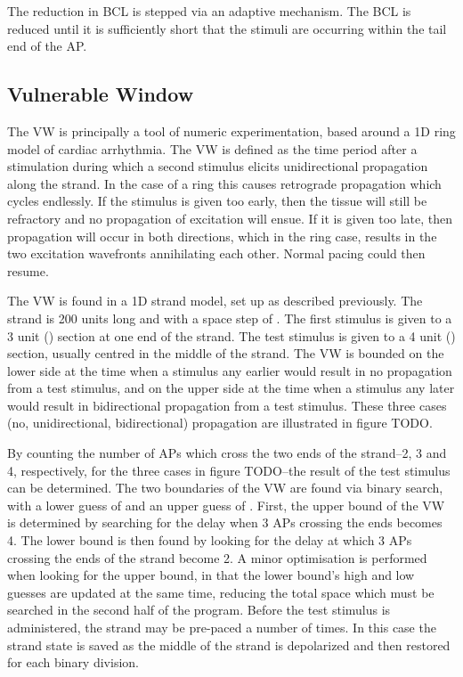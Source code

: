 The reduction in BCL is stepped via an adaptive mechanism.  The BCL is reduced
until it is sufficiently short that the stimuli are occurring within the tail end
of the AP.

\subsection{Vulnerable Window}

The VW is principally a tool of numeric experimentation, based around a 1D ring
model of cardiac arrhythmia.  The VW is defined as the time period after a
stimulation during which a second stimulus elicits unidirectional propagation
along the strand.  In the case of a ring this causes retrograde propagation
which cycles endlessly.  If the stimulus is given too early, then the tissue
will still be refractory and no propagation of excitation will ensue.  If it is
given too late, then propagation will occur in both directions, which in the
ring case, results in the two excitation wavefronts annihilating each other.
Normal pacing could then resume.

The VW is found in a 1D strand model, set up as described previously.  The
strand is 200 units long and with a space step of .  The first stimulus is
given to a 3 unit () section at one end of the strand.  The test stimulus
is given to a 4 unit () section, usually centred in the middle of the
strand. The VW is bounded on the lower side at the time when a stimulus any
earlier would result in no propagation from a test stimulus, and on the upper
side at the time when a stimulus any later would result in bidirectional
propagation from a test stimulus.  These three cases (no, unidirectional,
bidirectional) propagation are illustrated in figure TODO.

By counting the number of APs which cross the two ends of the strand--2, 3 and
4, respectively, for the three cases in figure TODO--the result of the test
stimulus can be determined.  The two boundaries of the VW are found via binary
search, with a lower guess of  and an upper guess of .  First, the
upper bound of the VW is determined by searching for the delay when 3 APs
crossing the ends becomes 4.  The lower bound is then found by looking for the
delay at which 3 APs crossing the ends of the strand become 2.  A minor
optimisation is performed when looking for the upper bound, in that the lower
bound's high and low guesses are updated at the same time, reducing the total
space which must be searched in the second half of the program.  Before the test
stimulus is administered, the strand may be pre-paced a number of times.  In
this case the strand state is saved as the middle of the strand is depolarized
and then restored for each binary division.

